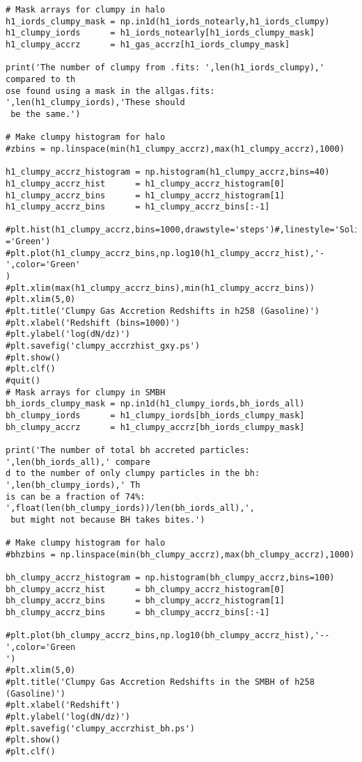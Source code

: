 \documentclass[12pt,headA,chapB]{fiskthesis}
\begin{document}
\begin{verbatim}
# Mask arrays for clumpy in halo
h1_iords_clumpy_mask = np.in1d(h1_iords_notearly,h1_iords_clumpy)
h1_clumpy_iords      = h1_iords_notearly[h1_iords_clumpy_mask]
h1_clumpy_accrz      = h1_gas_accrz[h1_iords_clumpy_mask]

print('The number of clumpy from .fits: ',len(h1_iords_clumpy),' compared to th
ose found using a mask in the allgas.fits: ',len(h1_clumpy_iords),'These should
 be the same.')

# Make clumpy histogram for halo
#zbins = np.linspace(min(h1_clumpy_accrz),max(h1_clumpy_accrz),1000)

h1_clumpy_accrz_histogram = np.histogram(h1_clumpy_accrz,bins=40)
h1_clumpy_accrz_hist      = h1_clumpy_accrz_histogram[0]
h1_clumpy_accrz_bins      = h1_clumpy_accrz_histogram[1]
h1_clumpy_accrz_bins      = h1_clumpy_accrz_bins[:-1]

#plt.hist(h1_clumpy_accrz,bins=1000,drawstyle='steps')#,linestyle='Solid',color
='Green')
#plt.plot(h1_clumpy_accrz_bins,np.log10(h1_clumpy_accrz_hist),'-',color='Green'
)
#plt.xlim(max(h1_clumpy_accrz_bins),min(h1_clumpy_accrz_bins))
#plt.xlim(5,0)
#plt.title('Clumpy Gas Accretion Redshifts in h258 (Gasoline)')
#plt.xlabel('Redshift (bins=1000)')
#plt.ylabel('log(dN/dz)')
#plt.savefig('clumpy_accrzhist_gxy.ps')
#plt.show()
#plt.clf()
#quit()
# Mask arrays for clumpy in SMBH
bh_iords_clumpy_mask = np.in1d(h1_clumpy_iords,bh_iords_all)
bh_clumpy_iords      = h1_clumpy_iords[bh_iords_clumpy_mask]
bh_clumpy_accrz      = h1_clumpy_accrz[bh_iords_clumpy_mask]

print('The number of total bh accreted particles: ',len(bh_iords_all),' compare
d to the number of only clumpy particles in the bh: ',len(bh_clumpy_iords),' Th
is can be a fraction of 74%: ',float(len(bh_clumpy_iords))/len(bh_iords_all),',
 but might not because BH takes bites.')

# Make clumpy histogram for halo
#bhzbins = np.linspace(min(bh_clumpy_accrz),max(bh_clumpy_accrz),1000)

bh_clumpy_accrz_histogram = np.histogram(bh_clumpy_accrz,bins=100)
bh_clumpy_accrz_hist      = bh_clumpy_accrz_histogram[0]
bh_clumpy_accrz_bins      = bh_clumpy_accrz_histogram[1]
bh_clumpy_accrz_bins      = bh_clumpy_accrz_bins[:-1]

#plt.plot(bh_clumpy_accrz_bins,np.log10(bh_clumpy_accrz_hist),'--',color='Green
')
#plt.xlim(5,0)
#plt.title('Clumpy Gas Accretion Redshifts in the SMBH of h258 (Gasoline)')
#plt.xlabel('Redshift')
#plt.ylabel('log(dN/dz)')
#plt.savefig('clumpy_accrzhist_bh.ps')
#plt.show()
#plt.clf()


\end{verbatim}
\end{document}
